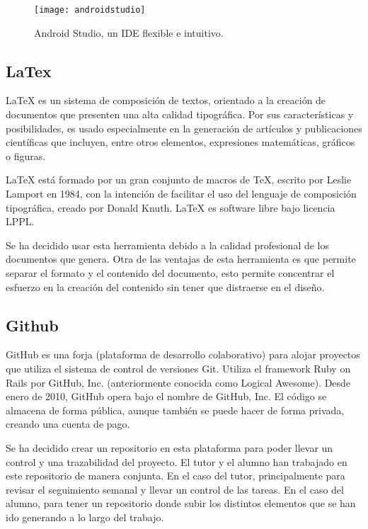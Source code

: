 \begin{figure}[h]
    \centering
    \texttt{[image: androidstudio]}
    \caption{Android Studio, un IDE flexible e intuitivo.}
    \label{fig:androidstudio}
\end{figure}

\subsection{LaTex}

LaTeX \cite{URL::LaTeX} es un sistema de composición de textos, orientado a la creación de documentos que presenten una alta calidad tipográfica. Por sus características y posibilidades, es usado especialmente en la generación de artículos y publicaciones científicas que incluyen, entre otros elementos, expresiones matemáticas, gráficos o figuras.

LaTeX está formado por un gran conjunto de macros de TeX, escrito por Leslie Lamport en 1984, con la intención de facilitar el uso del lenguaje de composición tipográfica, creado por Donald Knuth. LaTeX es software libre bajo licencia LPPL.

Se ha decidido usar esta herramienta debido a la calidad profesional de los documentos que genera. Otra de las ventajas de esta herramienta es que permite separar el formato y el contenido del documento, esto permite concentrar el esfuerzo en la creación del contenido sin tener que distraerse en el diseño. 

\vskip 0.5in

\subsection{Github}

GitHub \cite{URL::Github} es una forja (plataforma de desarrollo colaborativo) para alojar proyectos que utiliza el sistema de control de versiones Git. Utiliza el framework Ruby on Rails por GitHub, Inc.  (anteriormente conocida como Logical Awesome). Desde enero de 2010, GitHub opera bajo el nombre de GitHub, Inc. El código se almacena de forma pública, aunque también se puede hacer de forma privada, creando una cuenta de pago.

Se ha decidido crear un repositorio \cite{URL::repositorioAplicacion} en esta plataforma para poder llevar un control y una trazabilidad del proyecto. El tutor y el alumno han trabajado en este repositorio de manera conjunta. En el caso del tutor, principalmente para revisar el seguimiento semanal y llevar un control de las tareas. En el caso del alumno, para tener un repositorio donde subir los distintos elementos que se han ido generando a lo largo del trabajo. 

